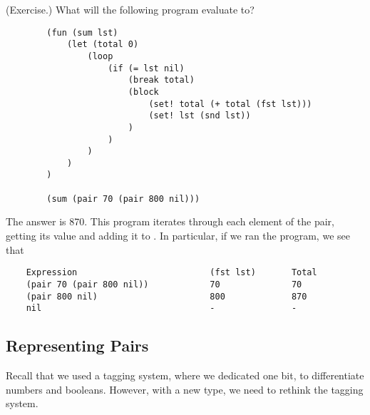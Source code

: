 \documentclass[letterpaper]{article}
\begin{document}
\begin{mdframed}
    (Exercise.) What will the following program evaluate to? 
    \begin{verbatim}
        (fun (sum lst)
            (let (total 0)
                (loop 
                    (if (= lst nil) 
                        (break total) 
                        (block
                            (set! total (+ total (fst lst)))
                            (set! lst (snd lst)) 
                        )
                    )
                )
            )
        )
    
        (sum (pair 70 (pair 800 nil)))\end{verbatim}
    
    \begin{mdframed}
        The answer is 870. This program iterates through each element of the pair, getting its value and adding it to . In particular, if we ran the program, we see that 
        \begin{verbatim}        
    Expression                          (fst lst)       Total
    (pair 70 (pair 800 nil))            70              70
    (pair 800 nil)                      800             870 
    nil                                 -               -\end{verbatim}
    \end{mdframed}
\end{mdframed}

\subsection{Representing Pairs}
Recall that we used a tagging system, where we dedicated one bit, to differentiate numbers and booleans. However, with a new type, we need to rethink the tagging system. 

\bigskip 
\end{document}
